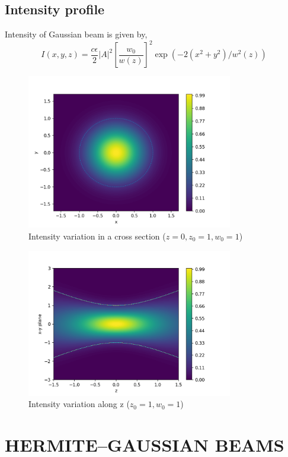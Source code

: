 \documentclass[11pt,a4paper]{article}
\begin{document}
\subsection{Intensity profile}
Intensity of Gaussian beam is given by,
$$I(x,y,z)=\frac{c\epsilon}{2} |A|^2 \left[\frac{w_0}{w(z)}\right]^2\exp{\left(-2(x^2+y^2)/w^2(z)\right)}$$ 




\begin{figure}[H]
	\centering
	\includegraphics[width=9cm]{intensity.png}
	\caption{Intensity variation in a cross section ($z=0,z_0=1,w_0=1$)}
	\label{fig:intensity}
\end{figure}





\begin{figure}[H]
	\centering
	\includegraphics[width=9cm]{intensity_var.png}
	\caption{Intensity variation along z ($z_0=1,w_0=1$)}
	\label{fig:intensity_var}
\end{figure}
\clearpage


\section{HERMITE–GAUSSIAN BEAMS}
\end{document}
